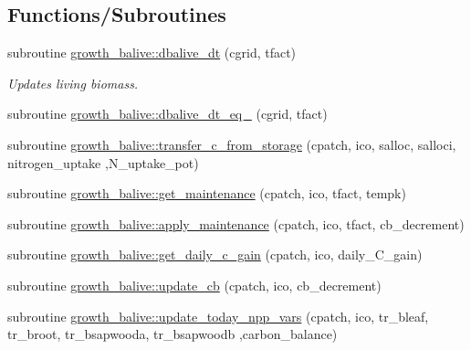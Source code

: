 \subsection*{Functions/\+Subroutines}
\begin{DoxyCompactItemize}
\item 
subroutine \hyperlink{namespacegrowth__balive_a7781ae229b2399c90d50858382665ee8}{growth\+\_\+balive\+::dbalive\+\_\+dt} (cgrid, tfact)
\begin{DoxyCompactList}\small\item\em Updates living biomass. \end{DoxyCompactList}\item 
subroutine \hyperlink{namespacegrowth__balive_a15cba39e9b70b8dd6a1e2d0cbdd5cc2e}{growth\+\_\+balive\+::dbalive\+\_\+dt\+\_\+eq\+\_} (cgrid, tfact)
\item 
subroutine \hyperlink{namespacegrowth__balive_add847b3fe5a1425632aea7c8a578d84f}{growth\+\_\+balive\+::transfer\+\_\+c\+\_\+from\+\_\+storage} (cpatch, ico, salloc, salloci, nitrogen\+\_\+uptake                                                                                                                                                                                           ,N\+\_\+uptake\+\_\+pot)
\item 
subroutine \hyperlink{namespacegrowth__balive_ac2f667372e6f2a5fc7329466cc958a6c}{growth\+\_\+balive\+::get\+\_\+maintenance} (cpatch, ico, tfact, tempk)
\item 
subroutine \hyperlink{namespacegrowth__balive_a692030d19fe1844dd9d9b676a9475e64}{growth\+\_\+balive\+::apply\+\_\+maintenance} (cpatch, ico, tfact, cb\+\_\+decrement)
\item 
subroutine \hyperlink{namespacegrowth__balive_ad43c7e3fcb88db17077ed58aeab8fe2d}{growth\+\_\+balive\+::get\+\_\+daily\+\_\+c\+\_\+gain} (cpatch, ico, daily\+\_\+\+C\+\_\+gain)
\item 
subroutine \hyperlink{namespacegrowth__balive_ac4ca7901eed6321044f171f6f1b8d7d6}{growth\+\_\+balive\+::update\+\_\+cb} (cpatch, ico, cb\+\_\+decrement)
\item 
subroutine \hyperlink{namespacegrowth__balive_a2bc138f187a465304da86a27fb804f45}{growth\+\_\+balive\+::update\+\_\+today\+\_\+npp\+\_\+vars} (cpatch, ico, tr\+\_\+bleaf, tr\+\_\+broot, tr\+\_\+bsapwooda, tr\+\_\+bsapwoodb                                                                                                                                       ,carbon\+\_\+balance)
\item 

\end{DoxyCompactItemize}
